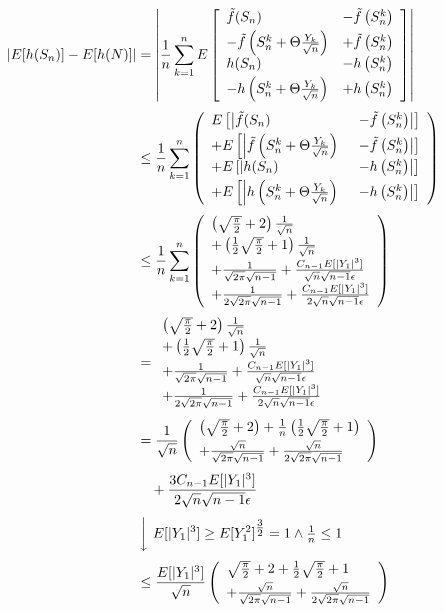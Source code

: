 \begin{align*}
\left|E[h(S_n)] - E[h(N)]\right| &= \left|\frac 1n \sum_{k=1}^n E \left[\begin{array}{ll} \tilde f(S_n) &-\tilde f\left(S_n^k\right)\nl
-\tilde f\left(S_n^k +\Theta \frac{Y_k}{\sqrt n}\right) &+ \tilde f\left(S_n^k\right)\nl
h(S_n)& - h\left(S_n^k\right) \nl
 -h\left(S_n^k +\Theta \frac{Y_k}{\sqrt n}\right) & + h\left(S_n^k\right) \end{array}\right] \right| \nl
&\le \frac 1n \sum_{k=1}^n \left(\begin{array}{ll} E\left[\left|\tilde f(S_n)\right.\right.&\left.\left.-\tilde f\left(S_n^k\right)\right|\right]\nl
+E\left[\left|\tilde f\left(S_n^k +\Theta \frac{Y_k}{\sqrt n}\right) \right.\right.&\left.\left.- \tilde f\left(S_n^k\right)\right|\right]\nl
+E\left[\left|h(S_n) \right.\right.&\left.\left. - h\left(S_n^k\right)\right|\right]\nl
+E\left[\left|h\left(S_n^k +\Theta \frac{Y_k}{\sqrt n}\right) \right.\right.&\left.\left. - h\left(S_n^k\right) \right|\right]\end{array}\right)  \nl
&\le \frac 1n \sum_{k=1}^n \left(\begin{array}{l}
\left(\sqrt{\tfrac\pi2}+2\right)\frac1{\sqrt n}\nl
+\left(\tfrac 12\sqrt{\tfrac \pi2}+1\right)\frac{1}{\sqrt n}\nl
+\tfrac{1}{\sqrt{2\pi}\sqrt{n-1}}+\frac{C_{n-1}E[|Y_1|^3]}{\sqrt{n}\sqrt{n-1}\epsilon}\nl
+\tfrac{1}{2\sqrt{2\pi}\sqrt{n-1}}+\frac{C_{n-1}E[|Y_1|^3]}{2\sqrt{n}\sqrt{n-1}\epsilon}
\end{array}  \right)\nl
&= \begin{array}{l}
\left(\sqrt{\tfrac\pi2}+2\right)\frac1{\sqrt n}\nl
+\left(\tfrac 12\sqrt{\tfrac \pi2}+1\right)\frac{1}{\sqrt n}\nl
+\tfrac{1}{\sqrt{2\pi}\sqrt{n-1}}+\frac{C_{n-1}E[|Y_1|^3]}{\sqrt{n}\sqrt{n-1}\epsilon}\nl
+\tfrac{1}{2\sqrt{2\pi}\sqrt{n-1}}+\frac{C_{n-1}E[|Y_1|^3]}{2\sqrt{n}\sqrt{n-1}\epsilon}\nl
\end{array}  \nl
&= \frac{1}{\sqrt n} \left(\begin{array}{l}\left(\sqrt{\frac\pi2}+2\right)+\frac 1n\left(\frac 12 \sqrt{\frac \pi2}+1\right)\nl +\frac{\sqrt{n}}{\sqrt{2\pi}\sqrt{n-1}} + \frac{\sqrt{n}}{2\sqrt{2\pi}\sqrt{n-1}}\end{array}\right) \nl
&\quad + \frac{3C_{n-1}E[|Y_1|^3]}{2\sqrt{n}\sqrt{n-1}\epsilon} \nl
&\left\downarrow\ E[|Y_1|^3] \ge E[Y_1^2]^{\tfrac 32}=1 \land \tfrac 1n \le 1\right.\nl
&\le \frac{E[|Y_1|^3]}{\sqrt n} \left(\begin{array}{l}\sqrt{\frac\pi2}+2+\frac 12 \sqrt{\frac \pi2}+1\nl +\frac{\sqrt{n}}{\sqrt{2\pi}\sqrt{n-1}} + \frac{\sqrt{n}}{2\sqrt{2\pi}\sqrt{n-1}}\end{array}\right) \nl

\end{align*}
